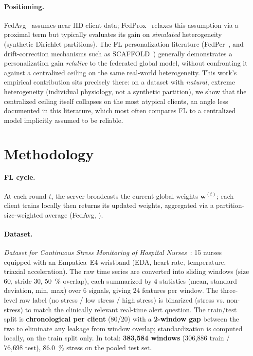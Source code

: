 \documentclass{acmart}
\begin{document}
\paragraph{Positioning.} FedAvg~\cite{mcmahan2017communication} assumes near-IID
client data; FedProx~\cite{li2020fedprox} relaxes this assumption via a proximal term
but typically evaluates its gain on \emph{simulated} heterogeneity (synthetic
Dirichlet partitions). The FL personalization literature (FedPer~\cite{arivazhagan2019federated},
and drift-correction mechanisms such as SCAFFOLD~\cite{karimireddy2020scaffold})
generally demonstrates a personalization gain \emph{relative} to the federated global
model, without confronting it against a centralized ceiling on the same real-world
heterogeneity. This work's empirical contribution sits precisely there: on a dataset
with \emph{natural}, extreme heterogeneity (individual physiology, not a synthetic
partition), we show that the centralized ceiling itself collapses on the most atypical
clients, an angle less documented in this literature, which most often compares FL to
a centralized model implicitly assumed to be reliable.

\section{Methodology}
\label{sec:method}

\paragraph{FL cycle.} At each round $t$, the server broadcasts the current global
weights $\mathbf{w}^{(t)}$; each client trains locally then returns its updated
weights, aggregated via a partition-size-weighted average (FedAvg,
\cite{mcmahan2017communication}).

\paragraph{Dataset.} \textit{Dataset for Continuous Stress Monitoring of Hospital
Nurses}~\cite{nurse_stress_dataset}: 15 nurses equipped with an Empatica~E4 wristband
(EDA, heart rate, temperature, triaxial acceleration). The raw time series are
converted into sliding windows (size 60, stride 30, 50~\% overlap), each summarized by
4 statistics (mean, standard deviation, min, max) over 6 signals, giving 24 features
per window. The three-level raw label (no stress / low stress / high stress) is
binarized (stress vs. non-stress) to match the clinically relevant real-time alert
question. The train/test split is \textbf{chronological per client} (80/20) with a
\textbf{2-window gap} between the two to eliminate any leakage from window overlap;
standardization is computed locally, on the train split only. In total:
\textbf{383,584 windows} (306,886 train / 76,698 test), 86.0~\% stress on the pooled
test set.
\end{document}
